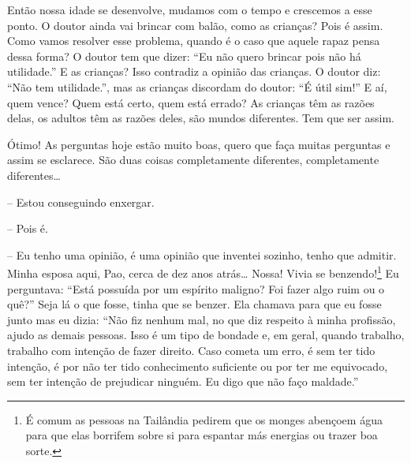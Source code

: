 Então nossa idade se desenvolve, mudamos com o tempo e crescemos a
esse ponto. O doutor ainda vai brincar com balão, como as crianças?
Pois é assim. Como vamos resolver esse problema, quando é o caso que
aquele rapaz pensa dessa forma? O doutor tem que dizer: “Eu não quero
brincar pois não há utilidade.” E as crianças? Isso contradiz a opinião
das crianças. O doutor diz: “Não tem utilidade.”, mas as crianças
discordam do doutor: “É útil sim!” E aí, quem vence? Quem está certo,
quem está errado? As crianças têm as razões delas, os adultos têm as
razões deles, são mundos diferentes. Tem que ser assim. 

Ótimo! As perguntas hoje estão muito boas, quero que faça muitas
perguntas e assim se esclarece. São duas coisas completamente
diferentes, completamente diferentes\ldots{}

-- Estou conseguindo enxergar.

-- Pois é. 

-- Eu tenho uma opinião, é uma opinião que inventei sozinho, tenho
que admitir. Minha esposa aqui, Pao, cerca de dez anos atrás\ldots{} Nossa!
Vivia se benzendo!\footnote{É comum as pessoas na Tailândia pedirem que
os monges abençoem água para que elas borrifem sobre si para espantar
más energias ou trazer boa sorte.} Eu perguntava: “Está possuída por
um espírito maligno? Foi fazer algo ruim ou o quê?” Seja lá o que
fosse, tinha que se benzer. Ela chamava para que eu fosse junto mas eu
dizia: “Não fiz nenhum mal, no que diz respeito à minha profissão,
ajudo as demais pessoas. Isso é um tipo de bondade e, em geral, quando
trabalho, trabalho com intenção de fazer direito. Caso cometa um erro,
é sem ter tido intenção, é por não ter tido conhecimento suficiente ou
por ter me equivocado, sem ter intenção de prejudicar ninguém. Eu digo
que não faço maldade.”

